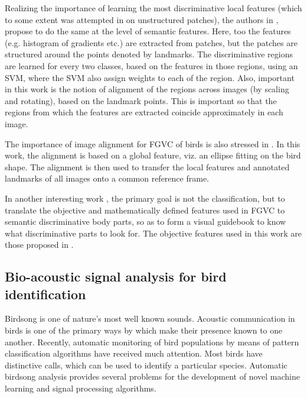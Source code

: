 \documentclass{article}
\begin{document}
Realizing the importance of learning the most discriminative local features (which to some extent was attempted in \cite{hierarchy} on unstructured patches), the authors in \cite{poof}, propose to do the same at the level of semantic features. Here, too the features (e.g. histogram of gradients etc.) are extracted from patches, but the patches are structured around the points denoted by landmarks. The discriminative regions are learned for every two classes, based on the features in those regions, using an SVM, where the SVM also assign weights to each of the region. Also, important in this work is the notion of alignment of the regions across images (by scaling and rotating), based on the landmark points. This is important so that the regions from which the features are extracted coincide approximately in each image. 

The importance of image alignment for FGVC of birds is also stressed in \cite{align}. In this work, the alignment is based on a global feature, viz. an ellipse fitting on the bird shape. The alignment is then used to transfer the local features and annotated landmarks of all images onto a common reference frame.  

In another interesting work \cite{crow}, the primary goal is not the classification, but to translate the objective and mathematically defined features used in FGVC to semantic discriminative body parts, so as to form a visual guidebook to know what discriminative parts to look for. The objective features used in this work are those proposed in \cite{poof}.
 
\subsection{Bio-acoustic signal analysis for bird identification}


Birdsong is one of nature's most well known sounds. Acoustic communication in
birds is one of the primary ways by which make their presence known to one
another. 
Recently, automatic monitoring of bird populations by means of pattern
classification algorithms have received much attention. Most birds have
distinctive calls, which can be used to identify a particular species. Automatic
birdsong analysis provides several problems for the development of novel machine learning
and signal processing algorithms.
\end{document}
